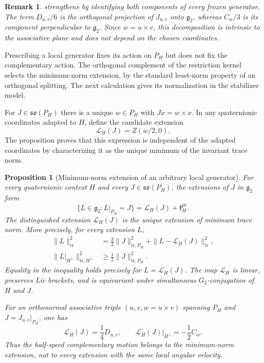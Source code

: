 \documentclass[11pt,a4paper]{article}
\newtheorem{proposition}[proposition]{Proposition}
\newtheorem{remark}[remark]{Remark}
\begin{document}
\begin{remark}
 strengthens  by identifying both components of every frozen generator.  The term $D_{u,v}/6$ is the orthogonal projection of $J_{u,v}$ onto $\mathfrak g_2$, whereas $C_w/3$ is its component perpendicular to $\mathfrak g_2$.  Since $w=u\times v$, this decomposition is intrinsic to the associative plane and does not depend on the chosen coordinates.
\end{remark}

Prescribing a local generator fixes its action on $P_H$ but does not fix the complementary action.  The orthogonal complement of the restriction kernel selects the minimum-norm extension, by the standard least-norm property of an orthogonal splitting.  The next calculation gives its normalization in the stabilizer model.

For $J\in\mathfrak{so}(P_H)$ there is a unique $w\in P_H$ with $Jx=w\times x$.
In any quaternionic coordinates adapted to $H$, define the candidate extension
\[
\mathcal L_H(J)=Z(w/2,0).
\]
The proposition proves that this expression is independent of the adapted coordinates by
characterizing it as the unique minimum of the invariant trace norm.

\begin{proposition}[Minimum-norm extension of an arbitrary local generator]
\label{cor:forced-motion}
For every quaternionic context $H$ and every $J\in\mathfrak{so}(P_H)$, the extensions of $J$ in $\mathfrak g_2$ form
\[
\{L\in\mathfrak g_2:L|_{P_H}=J\}
 =\mathcal L_H(J)+\mathfrak k_H^{\mathrm{pt}}.
\]
The distinguished extension $\mathcal L_H(J)$ is the unique extension of minimum trace norm.  More precisely, for every extension $L$,
\begin{align}
 \|L\|_{\mathrm{tr}}^2
 &=\frac32\|J\|_{\mathrm{tr},P_H}^2+
       \|L-\mathcal L_H(J)\|_{\mathrm{tr}}^2,\label{eq:minimum-lift-norm}\\
 \|L|_{H^\perp}\|_{\mathrm{tr},H^\perp}^2
 &\ge\frac12\|J\|_{\mathrm{tr},P_H}^2.\nonumber
\end{align}
Equality in the inequality holds precisely for $L=\mathcal L_H(J)$.  The map $\mathcal L_H$ is linear, preserves Lie brackets, and is equivariant under simultaneous $G_2$-conjugation of $H$ and $J$.

For an orthonormal associative triple $(u,v,w=u\times v)$ spanning $P_H$ and $J=J_{u,v}|_{P_H}$, one has
\[
\mathcal L_H(J)=\frac14D_{u,v},\qquad
\mathcal L_H(J)|_{H^\perp}=-\frac12C_w.
\]
Thus the half-speed complementary motion belongs to the minimum-norm extension, not to every extension with the same local angular velocity.
\end{proposition}
\end{document}
